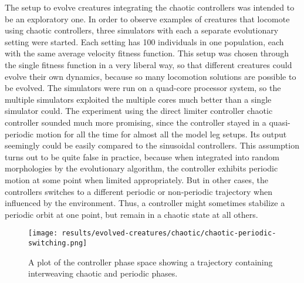 \documentclass[main]{subfiles}
\begin{document}
The setup to evolve creatures integrating the chaotic controllers was intended to be an exploratory one. %
%
In order to observe examples of creatures that locomote using chaotic controllers, three simulators with each a separate evolutionary setting were started. %
%
Each setting has 100 individuals in one population, each with the same average velocity fitness function. %
%
This setup was chosen through the single fitness function in a very liberal way, so that different creatures could evolve their own dynamics, because so many locomotion solutions are possible to be evolved. %
%
The simulators were run on a quad-core processor system, so the multiple simulators exploited the multiple cores much better than a single simulator could. %
%
The experiment using the direct limiter controller chaotic controller sounded much more promising, since the controller stayed in a quasi-periodic motion for all the time for almost all the model leg setups. %
%
Its output seemingly could be easily compared to the sinusoidal controllers. %
%
This assumption turns out to be quite false in practice, because when integrated into random morphologies by the evolutionary algorithm, the controller exhibits periodic motion at some point when limited appropriately. %
%
But in other cases, the controllers switches to a different periodic or non-periodic trajectory when influenced by the environment. %
% 
Thus, a controller might sometimes stabilize a periodic orbit at one point, but remain in a chaotic state at all others. %

\begin{figure}[H]
\centering
\texttt{[image: results/evolved-creatures/chaotic/chaotic-periodic-switching.png]}
\caption[Chaotic-periodic phase switching]{A plot of the controller phase space showing a trajectory containing interweaving chaotic and periodic phases.}
\label{figure:z-2.4-3.19-chaotictrajectories}
\end{figure}
\end{document}
